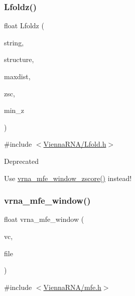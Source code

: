 \subsubsection{\texorpdfstring{Lfoldz()}{Lfoldz()}}
{\footnotesize\ttfamily float Lfoldz (\begin{DoxyParamCaption}\item[{const char $\ast$}]{string,  }\item[{char $\ast$}]{structure,  }\item[{int}]{maxdist,  }\item[{int}]{zsc,  }\item[{double}]{min\+\_\+z }\end{DoxyParamCaption})}



{\ttfamily \#include $<$\mbox{\hyperlink{_lfold_8h}{Vienna\+R\+N\+A/\+Lfold.\+h}}$>$}

\begin{DoxyRefDesc}{Deprecated}
\item[\mbox{\hyperlink{deprecated__deprecated000089}{Deprecated}}]Use \mbox{\hyperlink{group__local__mfe__fold_gaa4f67ae94efd08d800c17f9b53423fd6}{vrna\+\_\+mfe\+\_\+window\+\_\+zscore()}} instead! \end{DoxyRefDesc}
\mbox{\label{group__local__mfe__fold_ga689df235a1915a1ad56e377383c044ce}} 
\subsubsection{\texorpdfstring{vrna\+\_\+mfe\+\_\+window()}{vrna\_mfe\_window()}}
{\footnotesize\ttfamily float vrna\+\_\+mfe\+\_\+window (\begin{DoxyParamCaption}\item[{\mbox{\hyperlink{group__fold__compound_ga1b0cef17fd40466cef5968eaeeff6166}{vrna\+\_\+fold\+\_\+compound\+\_\+t}} $\ast$}]{vc,  }\item[{F\+I\+LE $\ast$}]{file }\end{DoxyParamCaption})}



{\ttfamily \#include $<$\mbox{\hyperlink{mfe_8h}{Vienna\+R\+N\+A/mfe.\+h}}$>$}



